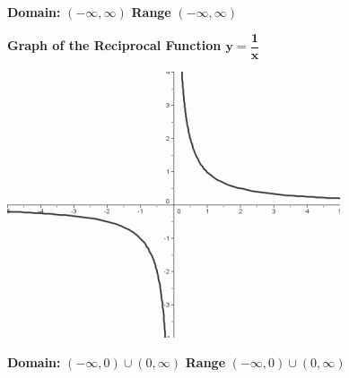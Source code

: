 \documentclass[12pt]{article}
\begin{document}
\textbf{Domain:} $(-\infty, \infty)$ \hspace{2cm} \textbf{Range} $(-\infty, \infty)$

\textbf{Graph of the Reciprocal Function $\mathbf{y=\dfrac{1}{x}}$}

\includegraphics{RecipFunction.jpg}

\textbf{Domain:} $(-\infty, 0) \cup (0, \infty)$ \hspace{2cm} \textbf{Range} $(-\infty, 0) \cup (0, \infty)$ 
\end{document}
